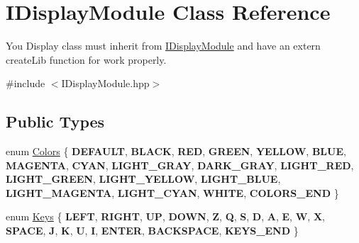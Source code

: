 \hypertarget{class_i_display_module}{}\section{I\+Display\+Module Class Reference}
\label{class_i_display_module}


You Display class must inherit from \hyperlink{class_i_display_module}{I\+Display\+Module} and have an extern create\+Lib function for work properly.  




{\ttfamily \#include $<$I\+Display\+Module.\+hpp$>$}

\subsection*{Public Types}
\begin{DoxyCompactItemize}
\item 
enum \hyperlink{class_i_display_module_a1130023f28ca7d10e4a04ef9b698fcbb}{Colors} \{ \newline
{\bfseries D\+E\+F\+A\+U\+LT}, 
{\bfseries B\+L\+A\+CK}, 
{\bfseries R\+ED}, 
{\bfseries G\+R\+E\+EN}, 
\newline
{\bfseries Y\+E\+L\+L\+OW}, 
{\bfseries B\+L\+UE}, 
{\bfseries M\+A\+G\+E\+N\+TA}, 
{\bfseries C\+Y\+AN}, 
\newline
{\bfseries L\+I\+G\+H\+T\+\_\+\+G\+R\+AY}, 
{\bfseries D\+A\+R\+K\+\_\+\+G\+R\+AY}, 
{\bfseries L\+I\+G\+H\+T\+\_\+\+R\+ED}, 
{\bfseries L\+I\+G\+H\+T\+\_\+\+G\+R\+E\+EN}, 
\newline
{\bfseries L\+I\+G\+H\+T\+\_\+\+Y\+E\+L\+L\+OW}, 
{\bfseries L\+I\+G\+H\+T\+\_\+\+B\+L\+UE}, 
{\bfseries L\+I\+G\+H\+T\+\_\+\+M\+A\+G\+E\+N\+TA}, 
{\bfseries L\+I\+G\+H\+T\+\_\+\+C\+Y\+AN}, 
\newline
{\bfseries W\+H\+I\+TE}, 
{\bfseries C\+O\+L\+O\+R\+S\+\_\+\+E\+ND}
 \}
\item 
enum \hyperlink{class_i_display_module_ac77668b52466bcd2dbd8446e5bfe412f}{Keys} \{ \newline
{\bfseries L\+E\+FT}, 
{\bfseries R\+I\+G\+HT}, 
{\bfseries UP}, 
{\bfseries D\+O\+WN}, 
\newline
{\bfseries Z}, 
{\bfseries Q}, 
{\bfseries S}, 
{\bfseries D}, 
\newline
{\bfseries A}, 
{\bfseries E}, 
{\bfseries W}, 
{\bfseries X}, 
\newline
{\bfseries S\+P\+A\+CE}, 
{\bfseries J}, 
{\bfseries K}, 
{\bfseries U}, 
\newline
{\bfseries I}, 
{\bfseries E\+N\+T\+ER}, 
{\bfseries B\+A\+C\+K\+S\+P\+A\+CE}, 
{\bfseries K\+E\+Y\+S\+\_\+\+E\+ND}
 \}
\end{DoxyCompactItemize}
